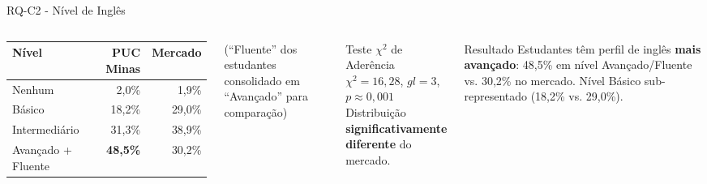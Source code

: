 \documentclass[fleqn]{beamer}
\begin{document}
\begin{frame}{RQ-C2 - Nível de Inglês}
\begin{columns}[T]
\begin{table}[H]
\centering
\scriptsize
\begin{tabular}{lrr}
\toprule
\textbf{Nível} & \textbf{PUC Minas} & \textbf{Mercado} \\
\midrule
Nenhum & 2,0\% & 1,9\% \\
Básico & 18,2\% & 29,0\% \\
Intermediário & 31,3\% & 38,9\% \\
Avançado + Fluente & \textbf{48,5\%} & 30,2\% \\
\bottomrule
\end{tabular}
\end{table}
\scriptsize{(``Fluente'' dos estudantes consolidado em ``Avançado'' para comparação)}

\begin{block}{Teste $\chi^2$ de Aderência}
$\chi^2 = 16{,}28$, $gl = 3$, $p \approx 0{,}001$\\[0.3cm]
Distribuição \textbf{significativamente diferente} do mercado.
\end{block}

\begin{exampleblock}{Resultado}
\footnotesize
Estudantes têm perfil de inglês \textbf{mais avançado}: 48,5\% em nível Avançado/Fluente vs. 30,2\% no mercado. Nível Básico sub-representado (18,2\% vs. 29,0\%).
\end{exampleblock}
\end{columns}
\end{frame}
\end{document}
